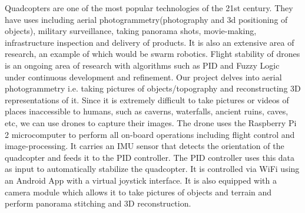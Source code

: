 Quadcopters are one of the most popular technologies of the 21st century. They have uses including aerial photogrammetry(photography and 3d positioning of objects), military surveillance, taking panorama shots, movie-making, infrastructure inspection and delivery of products. It is also an extensive area of research, an example of which would be swarm robotics. Flight stability of drones is an ongoing area of research with algorithms such as PID and Fuzzy Logic under continuous development and refinement.  
\newline
\newline
Our project delves into aerial photogrammetry i.e. taking pictures of objects/topography and reconstructing 3D representations of it. Since it is extremely difficult to take pictures or videos of places inaccessible to humans, such as caverns, waterfalls, ancient ruins, caves, etc, we can use drones to capture their images.
\newline
\newline
The drone uses the Raspberry Pi 2 microcomputer to perform all on-board operations including flight control and image-processing. It carries an IMU sensor that detects the orientation of the quadcopter and feeds it to the PID controller. The PID controller uses this data as input to automatically stabilize the quadcopter. 
It is controlled via WiFi using an Android App with a virtual joystick interface. It is also equipped with a camera module which allows it to take pictures of objects and terrain and perform panorama stitching and 3D reconstruction.